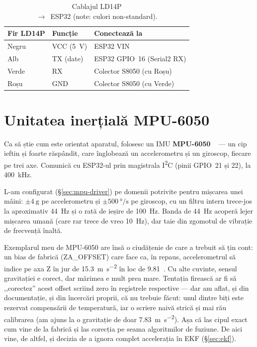 \documentclass[a4paper,12pt,twoside,openany]{report}
\renewcommand{\texttt}[1]{\textnormal{#1}}
\begin{document}
\begin{table}[H]
\centering
\caption{Cablajul LD14P\\$\rightarrow$~ESP32 (note: culori non-standard).}
\label{tab:lidar-wires}
\begin{tabular}{lll}
\toprule
\textbf{Fir LD14P} & \textbf{Funcție} & \textbf{Conectează la} \\
\midrule
Negru  & VCC (5~V)  & ESP32 VIN \\
Alb    & TX (date)  & ESP32 GPIO~16 (Serial2 RX) \\
Verde  & RX         & Colector S8050 (cu Roșu) \\
Roșu   & GND        & Colector S8050 (cu Verde) \\
\bottomrule
\end{tabular}
\end{table}

\section{Unitatea inerțială MPU-6050}
\label{sec:mpu6050}

Ca să știe cum este orientat aparatul, folosesc un IMU \textbf{MPU-6050}%
~\cite{mpu6050} — un cip ieftin și foarte răspândit, care înglobează un
accelerometru și un giroscop, fiecare pe trei axe. Comunică cu ESP32-ul prin
magistrala I\textsuperscript{2}C (pinii GPIO~21 și 22), la \SI{400}{\kilo\hertz}.

L-am configurat (§\ref{sec:mpu-driver}) pe domenii potrivite pentru mișcarea
unei mâini: $\pm\SI{4}{\g}$ pe accelerometru și $\pm\SI{500}{\degree\per\second}$
pe giroscop, cu un filtru intern trece-jos la aproximativ \SI{44}{\hertz} și o
rată de ieșire de \SI{100}{\hertz}. Banda de \SI{44}{\hertz} acoperă lejer
mișcarea umană (care rar trece de vreo \SI{10}{\hertz}), dar taie din zgomotul
de vibrație de frecvență înaltă.

Exemplarul meu de MPU-6050 are însă o ciudățenie de care a trebuit să țin cont:
un bias de fabrică (\texttt{ZA\_OFFSET}) care face ca, în repaus, accelerometrul
să indice pe axa Z în jur de \SI{15.3}{\meter\per\second\squared} în loc de
\SI{9.81}{}~\cite{mpu6050regmap}. Cu alte cuvinte, sensul gravitației e corect,
dar mărimea e mult prea mare. Tentația firească ar fi să ,,corectez'' acest
offset scriind zero în registrele respective — dar am aflat, și din documentație,
și din încercări proprii, că nu trebuie făcut: unul dintre biți este rezervat
compensării de temperatură, iar o scriere naivă strică și mai rău calibrarea (am
ajuns la o gravitație de doar \SI{7.83}{\meter\per\second\squared}). Așa că las
cipul exact cum vine de la fabrică și las corecția pe seama algoritmilor de
fuziune. De aici vine, de altfel, și decizia de a ignora complet accelerația în
EKF (§\ref{sec:ekf}).
\end{document}
